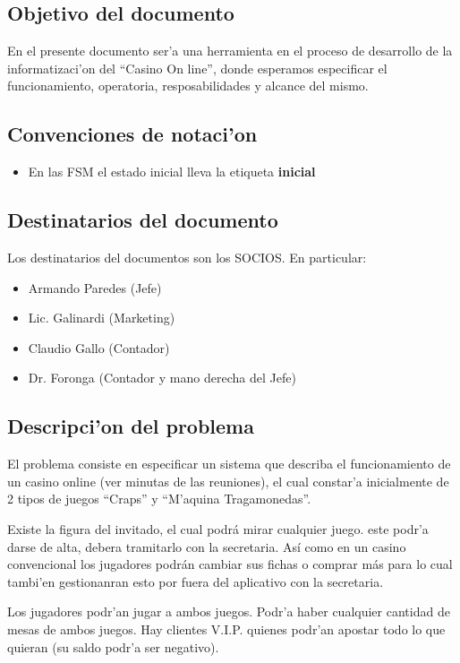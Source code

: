 \subsection{ Objetivo del documento	}

En el presente documento ser'a una herramienta en el proceso 
de desarrollo de la informatizaci'on del ``Casino On line'', donde 
esperamos especificar el funcionamiento, operatoria, resposabilidades y alcance
del mismo.


\subsection{ Convenciones de notaci'on	}
\begin{itemize}
    \item En las FSM el estado inicial lleva la etiqueta \textbf{inicial}
\end{itemize}


\subsection{ Destinatarios del documento	}
Los destinatarios del documentos son los SOCIOS. En particular:

\begin{itemize}
    \item Armando Paredes (Jefe)
    \item Lic. Galinardi (Marketing)
    \item Claudio Gallo (Contador)
    \item Dr. Foronga (Contador y mano derecha del Jefe)
\end{itemize}


\subsection{ Descripci'on del problema }
El problema consiste en especificar un sistema que describa el funcionamiento
de un casino online (ver minutas de las reuniones),
el cual constar'a inicialmente de 2 tipos de juegos  ``Craps'' y ``M'aquina Tragamonedas''.

Existe la figura del invitado, el cual podrá mirar cualquier juego.
este podr'a darse de alta, debera tramitarlo con la secretaria.
Así como en un casino convencional los jugadores podrán cambiar 
sus fichas o comprar más para lo cual tambi'en gestionanran esto por fuera del aplicativo con 
la secretaria.

Los jugadores podr'an jugar a ambos juegos. Podr'a haber cualquier cantidad de mesas de ambos
juegos.
Hay clientes V.I.P. quienes podr'an apostar todo lo que quieran (su saldo podr'a ser negativo).


